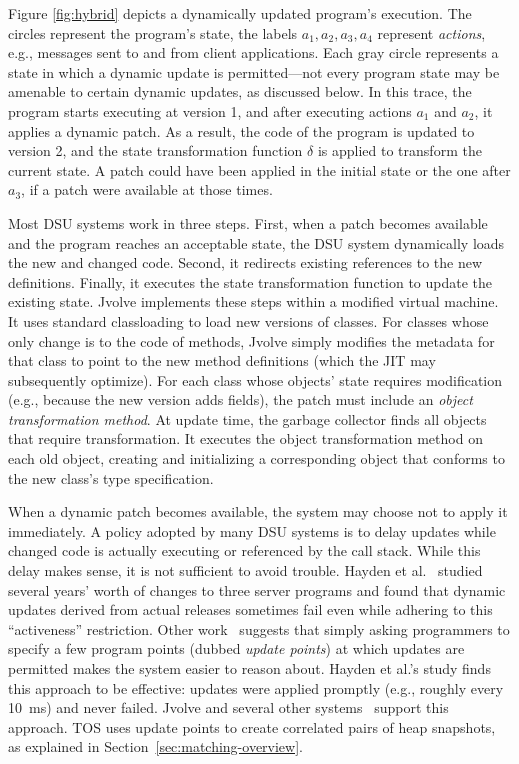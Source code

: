 \documentclass[natbib,10pt]{sigplanconf}
\newcommand{\TOS}{TOS\xspace}
\begin{document}
Figure \ref{fig:hybrid} depicts a dynamically updated program's
execution.  The circles represent the program's state, the labels
$a_1, a_2, a_3, a_4$ represent \emph{actions}, e.g., messages sent to
and from client applications.  Each gray circle represents a state in
which a dynamic update is permitted---not every program state may be
amenable to certain dynamic updates, as discussed below.
In this trace, the program starts executing
at version 1, and after executing actions $a_1$ and $a_2$, it applies
a dynamic patch.  As a result, the code of the program is updated to
version 2, and the state transformation function $\delta$ is applied
to transform the current state.  A patch could have been applied in
the initial state or the one after $a_3$,  if a patch were
available at those times.

Most DSU systems work in three steps.  First, when a patch becomes
available and the program reaches an acceptable state, the DSU system dynamically loads
the new and changed code.  Second, it redirects existing references
to the new definitions.  Finally, it executes the state
transformation function to update the existing state.  Jvolve
implements these steps within a modified virtual machine. It uses
standard classloading to load new versions of classes.  For classes
whose only change is to the code of methods, Jvolve simply modifies
the metadata for that class to point to the new method definitions
(which the JIT may subsequently optimize).  For each class whose
objects' state requires modification (e.g., because the new version
adds fields), the patch must include an \emph{object transformation
  method}.  At update time, the garbage collector finds all objects
that require transformation. It executes the object transformation
method on each old object, creating and initializing a corresponding object that
conforms to the new class's type specification.

When a dynamic patch becomes available, the system may choose not to apply
it immediately.  A policy adopted by many DSU systems is to delay
updates while changed code is actually executing or referenced by the
call stack.  While this delay makes sense, it is not sufficient to
avoid trouble.  Hayden et al.~\cite{hayden11testing-journal} studied
several years' worth of changes to three server programs and found
that dynamic updates derived from actual releases sometimes fail even
while adhering to this ``activeness'' restriction.  Other
work~\cite{HicksNettles03}  suggests that simply asking
programmers to specify a few program points (dubbed \emph{update
  points}) at which updates are permitted makes the system easier to
reason about.  Hayden et al.'s study finds this approach to be
effective: updates were applied promptly (e.g., roughly every 10~ms)
and never failed.  Jvolve and several other
systems~\cite{neamtiu06dsu,HicksNettles03,upstare} support this
approach. \TOS uses update points to create correlated pairs of heap snapshots, as 
explained in Section~\ref{sec:matching-overview}.
\end{document}
